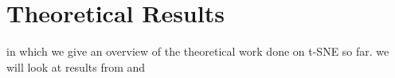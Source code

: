 \chapter{Theoretical Results}\label{chapter:theoretical_results}
in which we give an overview of the theoretical work done on t-SNE so far. 
we will look at results from \cite{JMLR:v23:21-0524} and \cite{LinStei22}